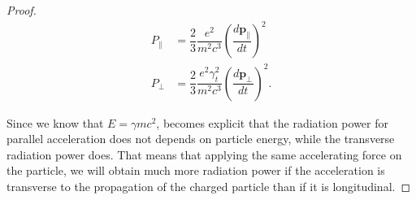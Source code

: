 \begin{proof}
\begin{align*}
P_\parallel &=   \dfrac{2}{3}\dfrac{e^2}{m^2c^3}\left(\dfrac{d\mathbf{p}_\parallel}{dt}\right)^2 \\
P_\perp &=   \dfrac{2}{3}\dfrac{e^2 \gamma^2_t}{m^2c^3}\left(\dfrac{d\mathbf{p}_\perp}{dt}\right)^2 .
\end{align*}

Since we know that $E = \gamma mc^2$, becomes explicit that the radiation power for parallel acceleration does not depends on particle energy, while the transverse radiation power does. That means that applying the same accelerating force on the particle, we will obtain much more radiation power if the acceleration
is transverse to the propagation of the charged particle than if it is longitudinal.
\end{proof}

